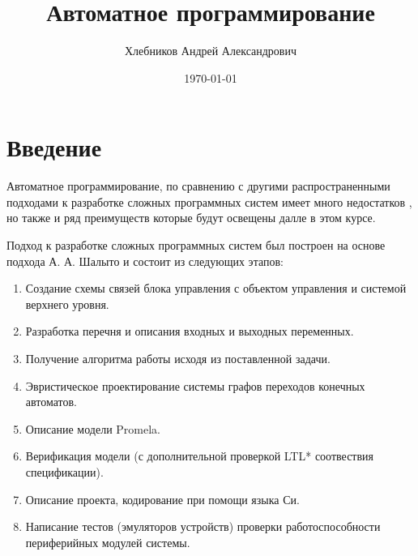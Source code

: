 \documentclass[12pt, twoside]{report}
\begin{document}
\pagestyle{empty}
\title{\textbf{Автоматное программирование}}
\author{Хлебников Андрей Александрович}
\date{\today}

\maketitle
\pagestyle{empty}
\newpage
\renewcommand{\cftchapdotsep}{\cftdotsep}
\tableofcontents
\newpage
\pagestyle{fancy}
\fancyhf{}
\lhead[]{\thepage}
\rhead[\thepage]{}

\singlespacing

\chapter*{Введение}


Автоматное программирование, по сравнению с другими распространенными подходами к 
разработке сложных программных систем имеет много недостатков , 
но также и ряд преимуществ которые будут освещены далле в этом курсе.

Подход к разработке сложных программных систем был построен на основе подхода А. А. Шалыто\cite{Shalito:AutomataProgramming} и 
состоит из следующих этапов:
\begin{enumerate}
  \item Создание схемы связей блока управления с объектом управления и системой верхнего уровня.
  \item Разработка перечня и описания входных и выходных переменных.
  \item Получение алгоритма работы исходя из поставленной задачи.
  \item Эвристическое проектирование системы графов переходов конечных автоматов.
  \item Описание модели Promela.
  \item Верификация модели (с дополнительной проверкой LTL* соотвествия спецификации).
  \item Описание проекта, кодирование при помощи языка Си.
  \item Написание тестов (эмуляторов устройств) проверки работоспособности периферийных модулей системы.
\end{enumerate}
\end{document}
